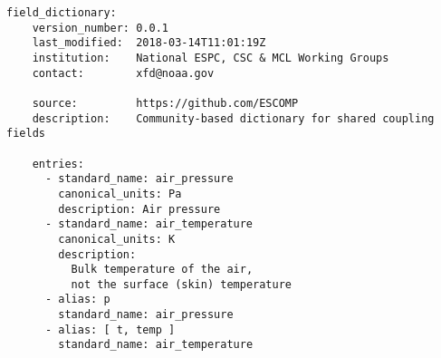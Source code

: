\begin{verbatim}
field_dictionary:
    version_number: 0.0.1
    last_modified:  2018-03-14T11:01:19Z
    institution:    National ESPC, CSC & MCL Working Groups
    contact:        xfd@noaa.gov

    source:         https://github.com/ESCOMP
    description:    Community-based dictionary for shared coupling fields

    entries:
      - standard_name: air_pressure
        canonical_units: Pa
        description: Air pressure
      - standard_name: air_temperature
        canonical_units: K
        description:
          Bulk temperature of the air,
          not the surface (skin) temperature
      - alias: p
        standard_name: air_pressure
      - alias: [ t, temp ]
        standard_name: air_temperature
\end{verbatim}
